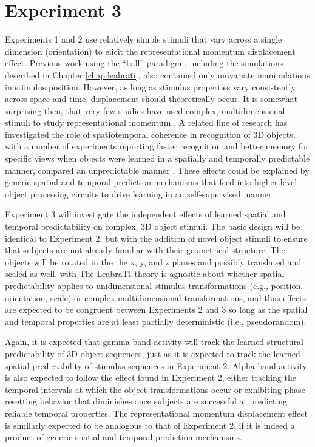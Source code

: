 \documentclass[defaultstyle,12pt]{thesis}
\begin{document}
{\section{Experiment 3}
Experiments 1 and 2 use relatively simple stimuli that vary across a single dimension (orientation) to elicit the representational momentum displacement effect. Previous work using the ``ball'' paradigm \cite{RohenkohlNobre11,DohertyRaoMesulamEtAl05}, including the simulations described in Chapter \ref{chap:leabrati}, also contained only univariate manipulations in stimulus position. However, as long as stimulus properties vary consistently across space and time, displacement should theoretically occur. It is somewhat surprising then, that very few studies have used complex, multidimensional stimuli to study representational momentum \cite[see][for one example that uses facial expressions]{YoshikawaSato08}. A related line of research has investigated the role of spatiotemporal coherence in recognition of 3D objects, with a number of experiments reporting  faster recognition and better memory for specific views when objects were learned in a spatially and temporally predictable manner, compared an unpredictable manner \cite{MitsumatsuYokosawa03,VuongTarr04,BalasSinha09b,WangZhang10}. These effects could be explained by generic spatial and temporal prediction mechanisms that feed into higher-level object processing circuits to drive learning in an self-supervised manner.

Experiment 3 will investigate the independent effects of learned spatial and temporal predictability on complex, 3D object stimuli. The basic design will be identical to Experiment 2, but with the addition of novel object stimuli to ensure that subjects are not already familiar with their geometrical structure. The objects will be rotated in the the x, y, and z planes and possibly translated and scaled as well. with The LeabraTI theory is agnostic about whether spatial predictability applies to unidimensional stimulus transformations (e.g., position, orientation, scale) or complex multidimensional transformations, and thus effects are expected to be congruent between Experiments 2 and 3 so long as the spatial and temporal properties are at least partially deterministic (i.e., pseudorandom).

Again, it is expected that gamma-band activity will track the learned structural predictability of 3D object sequences, just as it is expected to track the learned spatial predictability of stimulus sequences in Experiment 2. Alpha-band activity is also expected to follow the effect found in Experiment 2, either tracking the temporal intervals at which the object transformations occur or exhibiting phase-resetting behavior that diminishes once subjects are successful at predicting reliable temporal properties. The representational momentum displacement effect is similarly expected to be analogous to that of Experiment 2, if it is indeed a product of generic spatial and temporal prediction mechanisms.

}
\end{document}
